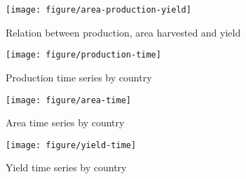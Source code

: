 \documentclass[nojss]{jss}\usepackage[]{graphicx}\usepackage[]{color}
\makeatletter
\def\maxwidth{ %
  \ifdim\Gin@nat@width>\linewidth
    \linewidth
  \else
    \Gin@nat@width
  \fi
}
\newenvironment{knitrout}{}{} %
\makeatother
\begin{document}
\begin{knitrout}
\color{fgcolor}\begin{figure}[!ht]


{\centering \texttt{[image: figure/area-production-yield]} 

}

\caption[Relation between production, area harvested and yield]{Relation between production, area harvested and yield\label{fig:area-production-yield}}
\end{figure}


\end{knitrout}


\begin{knitrout}
\color{fgcolor}\begin{figure}[!ht]


{\centering \texttt{[image: figure/production-time]} 

}

\caption[Production time series by country]{Production time series by country\label{fig:production-time}}
\end{figure}


\end{knitrout}


\begin{knitrout}
\color{fgcolor}\begin{figure}[!ht]


{\centering \texttt{[image: figure/area-time]} 

}

\caption[Area time series by country]{Area time series by country\label{fig:area-time}}
\end{figure}


\end{knitrout}


\begin{knitrout}
\color{fgcolor}\begin{figure}[!ht]


{\centering \texttt{[image: figure/yield-time]} 

}

\caption[Yield time series by country]{Yield time series by country\label{fig:yield-time}}
\end{figure}


\end{knitrout}
\end{document}

